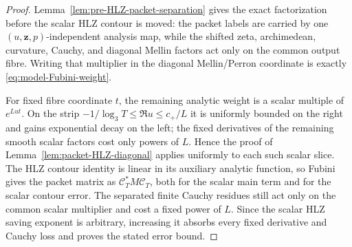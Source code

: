 \begin{proof}
Lemma~\ref{lem:pre-HLZ-packet-separation} gives the exact factorization before
the scalar HLZ contour is moved: the packet labels are carried by one
$(u,\mathbf z,p)$-independent analysis map, while the shifted zeta,
archimedean, curvature, Cauchy, and diagonal Mellin factors act only on the
common output fibre.  Writing that multiplier in the diagonal Mellin/Perron
coordinate is exactly \eqref{eq:model-Fubini-weight}.

For fixed fibre coordinate $t$, the remaining analytic weight is a scalar
multiple of $e^{Lut}$. On the strip
$-1/\log_3T\le\Re u\le c_+/L$ it is uniformly bounded on the right and gains
exponential decay on the left; the fixed derivatives of the remaining smooth
scalar factors cost only powers of $L$. Hence the proof of
Lemma~\ref{lem:packet-HLZ-diagonal} applies uniformly to each such scalar
slice. The HLZ contour identity is linear in its auxiliary analytic function,
so Fubini gives the packet matrix as
$\mathscr C_T^*M\mathscr C_T$, both for the scalar main term and for the scalar
contour error. The separated finite Cauchy residues still act only on the
common scalar multiplier and cost a fixed power of $L$. Since the scalar HLZ
saving exponent is arbitrary, increasing it absorbs every fixed derivative and
Cauchy loss and proves the stated error bound.
\end{proof}

